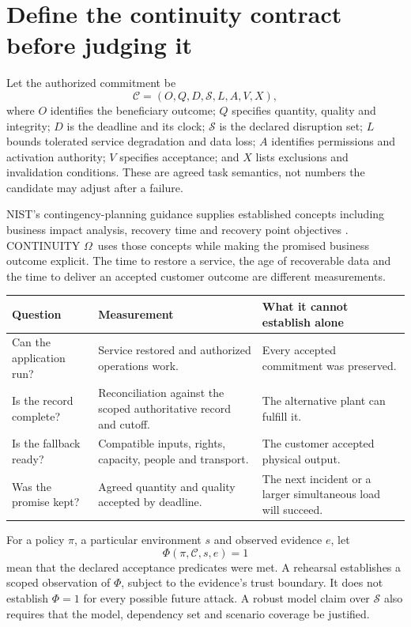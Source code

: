 \documentclass[11pt,a4paper]{article}
\newcommand{\om}{CONTINUITY $\Omega$}
\begin{document}
\section{Define the continuity contract before judging it}\label{sec:contract}
Let the authorized commitment be
\begin{equation}
\mathcal C=(O,Q,D,\mathcal S,L,A,V,X),
\end{equation}
where $O$ identifies the beneficiary outcome; $Q$ specifies quantity, quality and integrity; $D$ is the deadline and its clock; $\mathcal S$ is the declared disruption set; $L$ bounds tolerated service degradation and data loss; $A$ identifies permissions and activation authority; $V$ specifies acceptance; and $X$ lists exclusions and invalidation conditions. These are agreed task semantics, not numbers the candidate may adjust after a failure.

NIST's contingency-planning guidance supplies established concepts including business impact analysis, recovery time and recovery point objectives \cite{nist34}. \om\ uses those concepts while making the promised business outcome explicit. The time to restore a service, the age of recoverable data and the time to deliver an accepted customer outcome are different measurements.

\begin{center}\small
\begin{tabularx}{\textwidth}{P{.22\textwidth}YY}
\toprule
\textbf{Question} & \textbf{Measurement} & \textbf{What it cannot establish alone}\\
\midrule
Can the application run? & Service restored and authorized operations work. & Every accepted commitment was preserved.\\
Is the record complete? & Reconciliation against the scoped authoritative record and cutoff. & The alternative plant can fulfill it.\\
Is the fallback ready? & Compatible inputs, rights, capacity, people and transport. & The customer accepted physical output.\\
Was the promise kept? & Agreed quantity and quality accepted by deadline. & The next incident or a larger simultaneous load will succeed.\\
\bottomrule
\end{tabularx}
\end{center}

For a policy $\pi$, a particular environment $s$ and observed evidence $e$, let
\begin{equation}
\Phi(\pi,\mathcal C,s,e)=1
\end{equation}
mean that the declared acceptance predicates were met. A rehearsal establishes a scoped observation of $\Phi$, subject to the evidence's trust boundary. It does not establish $\Phi=1$ for every possible future attack. A robust model claim over $\mathcal S$ also requires that the model, dependency set and scenario coverage be justified.
\end{document}
